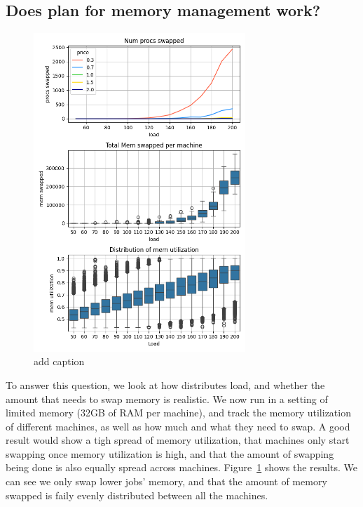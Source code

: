 \subsection{Does \sys{} plan for memory management work?}

\begin{figure}[t!]
    \centering
      \includegraphics[width=8cm]{img/memory_graphs.png}
      \caption{ add caption }
    \label{fig:memory-graphs}
\end{figure}

To answer this question, we look at how \sys{} distributes load, and whether the
amount that \sys{} needs to swap memory is realistic. We now run \sys{} in a
setting of limited memory (32GB of RAM per machine), and track the memory
utilization of different machines, as well as how much and what they need to
swap. A good result would show a tigh spread of memory utilization, that
machines only start swapping once memory utilization is high, and that the
amount of swapping being done is also equally spread across machines.
Figure~\ref{fig:memory-graphs} shows the results. We can see we only swap lower
\class{} jobs' memory, and that the amount of memory swapped is faily evenly
distributed between all the machines.


